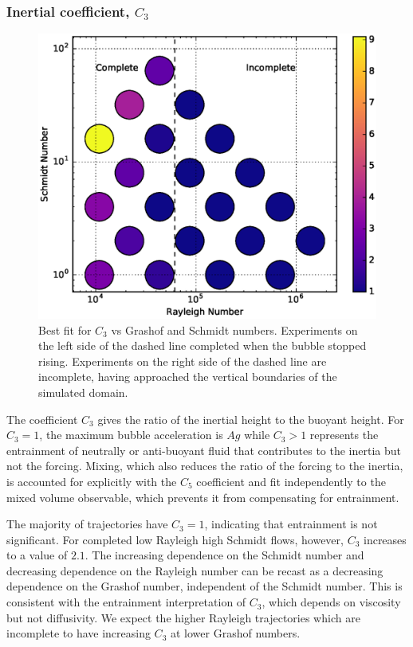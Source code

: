\subsubsection{Inertial coefficient, $C_3$}
\begin{figure}
\includegraphics[width=\columnwidth]{figs/C3-vs-Rayleigh-Schmidt}
\caption{ 
  Best fit for $C_3$ vs Grashof and Schmidt numbers.
  Experiments on the left side of the dashed line completed when the bubble stopped rising.
  Experiments on the right side of the dashed line are incomplete, having approached the vertical boundaries of the simulated domain.
}
\end{figure}

The coefficient $C_3$ gives the ratio of the inertial height to the buoyant height.
For $C_3 = 1$, the maximum bubble acceleration is $A g$ while $C_3 > 1$ represents the entrainment of neutrally or anti-buoyant fluid that contributes to the inertia but not the forcing.
Mixing, which also reduces the ratio of the forcing to the inertia, is accounted for explicitly with the $C_5$ coefficient and fit independently to the mixed volume observable, which prevents it from compensating for entrainment.

The majority of trajectories have $C_3 = 1$, indicating that entrainment is not significant.
For completed low Rayleigh high Schmidt flows, however, $C_3$ increases to a value of $2.1$.
The increasing dependence on the Schmidt number and decreasing dependence on the Rayleigh number can be recast as a decreasing dependence on the Grashof number, independent of the Schmidt number.
This is consistent with the entrainment interpretation of $C_3$, which depends on viscosity but not diffusivity.
We expect the higher Rayleigh trajectories which are incomplete to have increasing $C_3$ at lower Grashof numbers.

